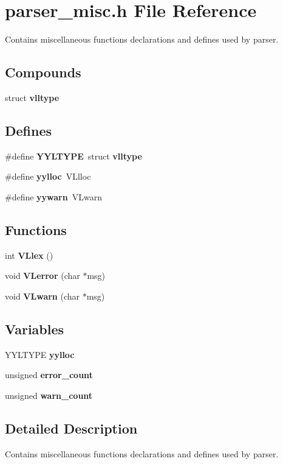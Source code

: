 \section{parser\_\-misc.h File Reference}
\label{parser__misc_8h}
Contains miscellaneous functions declarations and defines used by parser.  


\subsection*{Compounds}
\begin{CompactItemize}
\item 
struct {\bf vlltype}
\end{CompactItemize}
\subsection*{Defines}
\begin{CompactItemize}
\item 
\#define {\bf YYLTYPE}\ struct {\bf vlltype}
\item 
\#define {\bf yylloc}\ VLlloc
\item 
\#define {\bf yywarn}\ VLwarn
\end{CompactItemize}
\subsection*{Functions}
\begin{CompactItemize}
\item 
int {\bf VLlex} ()
\item 
void {\bf VLerror} (char $\ast$msg)
\item 
void {\bf VLwarn} (char $\ast$msg)
\end{CompactItemize}
\subsection*{Variables}
\begin{CompactItemize}
\item 
YYLTYPE {\bf yylloc}
\item 
unsigned {\bf error\_\-count}
\item 
unsigned {\bf warn\_\-count}
\end{CompactItemize}


\subsection{Detailed Description}
Contains miscellaneous functions declarations and defines used by parser. 

